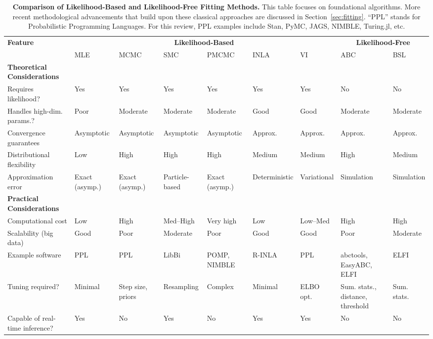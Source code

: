 \documentclass{article}
\begin{document}
\begin{landscape}
\begin{table}[ht]
\renewcommand{\arraystretch}{1.2}
\centering
\caption{\textbf{Comparison of Likelihood-Based and Likelihood-Free Fitting Methods.} 
This table focuses on foundational algorithms. More recent methodological advancements that build upon these classical approaches are discussed in Section~\ref{sec:fitting}. ``PPL'' stands for Probabilistic Programming Languages. For this review, PPL examples include Stan, PyMC, JAGS, NIMBLE, Turing.jl, etc.}
\label{tab:methods_comparison}
\small
\begin{tabular}{@{}p{3.5cm}p{1.5cm}p{1.5cm}p{1.5cm}p{1.5cm}p{1.5cm}p{1.5cm}p{1.5cm}p{1.5cm}@{}}
\toprule
\multirow{2}{*}{\textbf{Feature}} & \multicolumn{6}{c}{\textbf{Likelihood-Based}} & \multicolumn{2}{c}{\textbf{Likelihood-Free}} \\
\cmidrule(lr){2-7} \cmidrule(lr){8-9}
 & MLE & MCMC & SMC & PMCMC & INLA & VI & ABC & BSL \\
\midrule
\textbf{Theoretical Considerations} & & & & & & & & \\
\midrule
Requires likelihood? & Yes & Yes & Yes & Yes & Yes & Yes & No & No \\
Handles high-dim. params.? & Poor & Moderate & Moderate & Moderate & Good & Good & Moderate & Moderate \\
Convergence guarantees & Asymptotic & Asymptotic & Asymptotic & Asymptotic & Approx. & Approx. & Approx. & Approx. \\
Distributional flexibility & Low & High & High & High & Medium & Medium & High & Medium \\
Approximation error & Exact (asymp.) & Exact (asymp.) & Particle-based & Exact (asymp.) & Deterministic & Variational & Simulation & Simulation \\
\midrule
\textbf{Practical Considerations} & & & & & & & & \\
\midrule
Computational cost & Low & High & Med--High & Very high & Low & Low--Med & High & High \\
Scalability (big data) & Good & Poor & Moderate & Poor & Good & Good & Poor & Moderate \\
Example software & PPL & PPL & LibBi & POMP, NIMBLE & R-INLA & PPL & abctools, EasyABC, ELFI & ELFI \\
Tuning required? & Minimal & Step size, priors & Resampling & Complex & Minimal & ELBO opt. & Sum. stats., distance, threshold & Sum. stats. \\
Capable of real-time inference? & Yes & No & Yes & No & Yes & Yes & No & No \\

\end{tabular}
\end{table}
\end{landscape}
\end{document}
